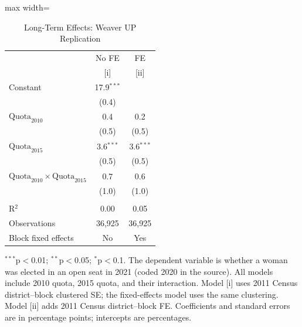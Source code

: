 
\begin{table}[htbp]
   \centering
   \scriptsize
   \begin{adjustbox}{max width=\linewidth}
      \begin{threeparttable}[b]
         \caption{\label{tab:weaver_long} Long-Term Effects: Weaver UP Replication}
         \bigskip
         \begin{tabular}{lcc}
            \toprule
                                                                & No FE        & FE \\
                                                                & [i]          & [ii]\\
            \midrule
            Constant                                            & 17.9$^{***}$ &   \\
                                                                & (0.4)        &   \\
            $\text{Quota}_{2010}$                               & 0.4          & 0.2\\
                                                                & (0.5)        & (0.5)\\
            $\text{Quota}_{2015}$                               & 3.6$^{***}$  & 3.6$^{***}$\\
                                                                & (0.5)        & (0.5)\\
            $\text{Quota}_{2010} \times \text{Quota}_{2015}$    & 0.7          & 0.6\\
                                                                & (1.0)        & (1.0)\\
             \\
            R$^2$                                               & 0.00         & 0.05\\
            Observations                                        & 36,925       & 36,925\\
            Block fixed effects                                 & No           & Yes\\
            \bottomrule
         \end{tabular}

         \begin{tablenotes}
            \item $^{***}$p$<$0.01; $^{**}$p$<$0.05; $^{*}$p$<$0.1. The dependent variable is whether a woman was elected in an open seat in 2021 (coded 2020 in the source). All models include 2010 quota, 2015 quota, and their interaction. Model [i] uses 2011 Census district--block clustered SE; the fixed-effects model uses the same clustering. Model [ii] adds 2011 Census district--block FE. Coefficients and standard errors are in percentage points; intercepts are percentages.
         \end{tablenotes}
      \end{threeparttable}
   \end{adjustbox}
\end{table}


